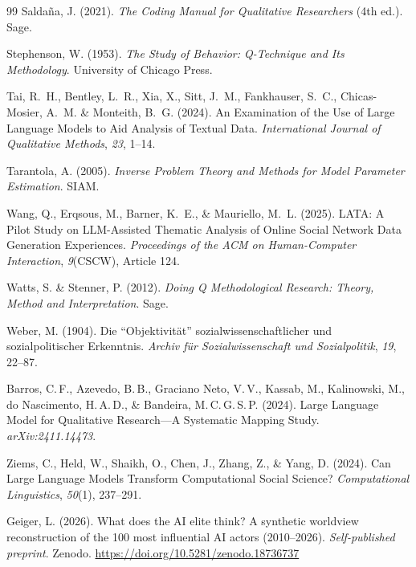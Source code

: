 \documentclass[11pt,a4paper]{article}
\theoremstyle{definition}
\theoremstyle{plain}
\theoremstyle{remark}
\begin{document}
\begin{thebibliography}{99}
  Salda\~{n}a, J. (2021).
  \textit{The Coding Manual for Qualitative Researchers} (4th ed.).
  Sage.

  Stephenson, W. (1953).
  \textit{The Study of Behavior: Q-Technique and Its Methodology}.
  University of Chicago Press.

  Tai, R.~H., Bentley, L.~R., Xia, X., Sitt, J.~M., Fankhauser, S.~C., Chicas-Mosier, A.~M. \& Monteith, B.~G. (2024).
  An Examination of the Use of Large Language Models to Aid Analysis of Textual Data.
  \textit{International Journal of Qualitative Methods}, \textit{23}, 1--14.

  Tarantola, A. (2005).
  \textit{Inverse Problem Theory and Methods for Model Parameter Estimation}.
  SIAM.

  Wang, Q., Erqsous, M., Barner, K.~E., \& Mauriello, M.~L. (2025).
  LATA: A Pilot Study on LLM-Assisted Thematic Analysis of Online Social Network Data Generation Experiences.
  \textit{Proceedings of the ACM on Human-Computer Interaction}, \textit{9}(CSCW), Article 124.

  Watts, S. \& Stenner, P. (2012).
  \textit{Doing Q Methodological Research: Theory, Method and Interpretation}.
  Sage.

  Weber, M. (1904).
  Die ``Objektivit\"at'' sozialwissenschaftlicher und sozialpolitischer Erkenntnis.
  \textit{Archiv f\"ur Sozialwissenschaft und Sozialpolitik}, \textit{19}, 22--87.

  Barros, C.\,F., Azevedo, B.\,B., Graciano Neto, V.\,V., Kassab, M., Kalinowski, M., do Nascimento, H.\,A.\,D., \& Bandeira, M.\,C.\,G.\,S.\,P. (2024).
  Large Language Model for Qualitative Research---A Systematic Mapping Study.
  \textit{arXiv:2411.14473}.

  Ziems, C., Held, W., Shaikh, O., Chen, J., Zhang, Z., \& Yang, D. (2024).
  Can Large Language Models Transform Computational Social Science?
  \textit{Computational Linguistics}, \textit{50}(1), 237--291.

  Geiger, L. (2026).
  What does the AI elite think? A synthetic worldview reconstruction of the 100 most influential AI actors (2010--2026).
  \textit{Self-published preprint}. Zenodo. \url{https://doi.org/10.5281/zenodo.18736737}


\end{thebibliography}
\end{document}
